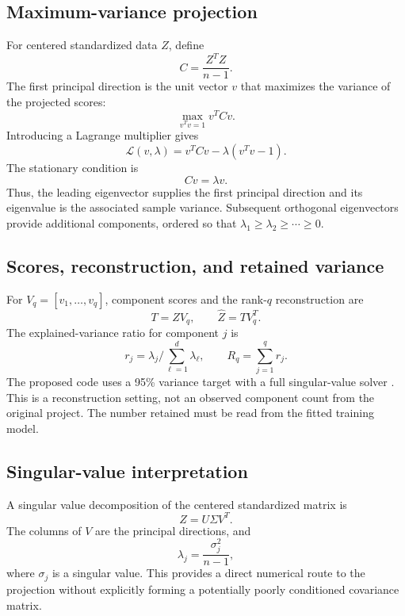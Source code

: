 \documentclass[11pt,a4paper]{article}
\begin{document}
\subsection{Maximum-variance projection}
For centered standardized data $Z$, define
\begin{equation}
C=\frac{Z^TZ}{n-1}.
\end{equation}
The first principal direction is the unit vector $v$ that maximizes the variance of the projected scores:
\begin{equation}
\max_{v^Tv=1} v^TCv.
\end{equation}
Introducing a Lagrange multiplier gives
\begin{equation}
\mathcal L(v,\lambda)=v^TCv-\lambda(v^Tv-1).
\end{equation}
The stationary condition is
\begin{equation}
Cv=\lambda v.
\end{equation}
Thus, the leading eigenvector supplies the first principal direction and its eigenvalue is the associated sample variance. Subsequent orthogonal eigenvectors provide additional components, ordered so that $\lambda_1\geq\lambda_2\geq\cdots\geq0$.

\subsection{Scores, reconstruction, and retained variance}
For $V_q=[v_1,\ldots,v_q]$, component scores and the rank-$q$ reconstruction are
\begin{equation}
T=ZV_q,\qquad \widehat Z=TV_q^T.
\end{equation}
The explained-variance ratio for component $j$ is
\begin{equation}
r_j=\lambda_j\Big/\sum_{\ell=1}^d\lambda_\ell,
\qquad R_q=\sum_{j=1}^q r_j.
\end{equation}
The proposed code uses a 95\% variance target with a full singular-value solver \cite{pca}. This is a reconstruction setting, not an observed component count from the original project. The number retained must be read from the fitted training model.

\clearpage
\subsection{Singular-value interpretation}
A singular value decomposition of the centered standardized matrix is
\begin{equation}
Z=U\Sigma V^T.
\end{equation}
The columns of $V$ are the principal directions, and
\begin{equation}
\lambda_j=\frac{\sigma_j^2}{n-1},
\end{equation}
where $\sigma_j$ is a singular value. This provides a direct numerical route to the projection without explicitly forming a potentially poorly conditioned covariance matrix.
\end{document}
